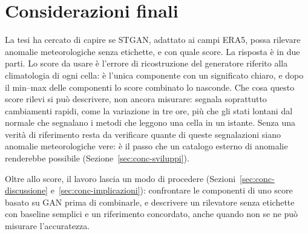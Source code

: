 \section{Considerazioni finali}

La tesi ha cercato di capire se STGAN, adattato ai campi ERA5, possa rilevare anomalie meteorologiche senza etichette, e con quale score. La risposta è in due parti. Lo score da usare è l'errore di ricostruzione del generatore riferito alla climatologia di ogni cella: è l'unica componente con un significato chiaro, e dopo il min--max delle componenti lo score combinato lo nasconde. Che cosa questo score rilevi si può descrivere, non ancora misurare: segnala soprattutto cambiamenti rapidi, come la variazione in tre ore, più che gli stati lontani dal normale che segnalano i metodi che leggono una cella in un istante. Senza una verità di riferimento resta da verificare quante di queste segnalazioni siano anomalie meteorologiche vere: è il passo che un catalogo esterno di anomalie renderebbe possibile (Sezione~\ref{sec:conc-sviluppi}).

Oltre allo score, il lavoro lascia un modo di procedere (Sezioni~\ref{sec:conc-discussione} e~\ref{sec:conc-implicazioni}): confrontare le componenti di uno score basato su GAN prima di combinarle, e descrivere un rilevatore senza etichette con baseline semplici e un riferimento concordato, anche quando non se ne può misurare l'accuratezza.

